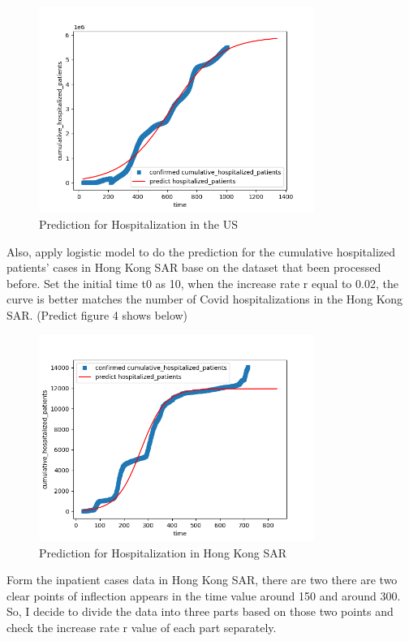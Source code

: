\documentclass[12pt]{article}
\begin{document}
	\begin{figure}[h]
		\centering
		\includegraphics[width=0.8\textwidth]{Figure3.png}
		\caption{Prediction for Hospitalization in the US}
	\end{figure}
	
	Also, apply logistic model to do the prediction for the cumulative hospitalized patients’ cases in Hong Kong SAR base on the dataset that been processed before. Set the initial time t0 as 10, when the increase rate r equal to 0.02, the curve is better matches the number of Covid hospitalizations in the Hong Kong SAR. (Predict figure 4 shows below)
	\clearpage
	\begin{figure}[h]
		\centering
		\includegraphics[width=0.8\textwidth]{Figure4.png}
		\caption{Prediction for Hospitalization in Hong Kong SAR}
	\end{figure}
	
	Form the inpatient cases data in Hong Kong SAR, there are two there are two clear points of inflection appears in the time value around 150 and around 300. So, I decide to divide the data into three parts based on those two points and check the increase rate r value of each part separately.
	
\end{document}
